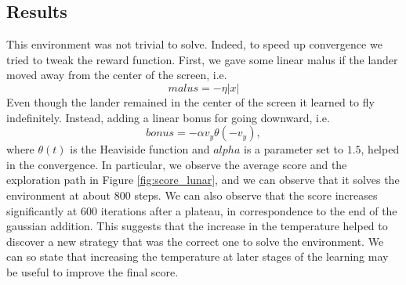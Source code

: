 \subsection{Results}
This environment was not trivial to solve. Indeed, to speed up convergence we tried to tweak the reward function. First, we gave some linear malus
if the lander moved away from the center of the screen, i.e.
$$
malus = -\eta |x|
$$
Even though the lander remained in the center of the screen it learned to fly indefinitely. Instead, adding a linear bonus for going downward, i.e.
$$
bonus = -\alpha v_y \theta(-v_y),
$$ 
where $\theta(t)$ is the Heaviside function and $alpha$ is a parameter set to $1.5$, helped in the convergence. In particular, we observe the average score and the exploration path in 
Figure \ref{fig:score_lunar}, and we can observe that it solves the environment at about $800$ steps. We can also observe that the score increases significantly at $600$ iterations after
a plateau, in correspondence to the end of the gaussian addition. This suggests that the increase in the temperature helped to discover a new strategy that was the correct one to solve the 
environment. We can so state that increasing the temperature at later stages of the learning may be useful to improve the final score.
